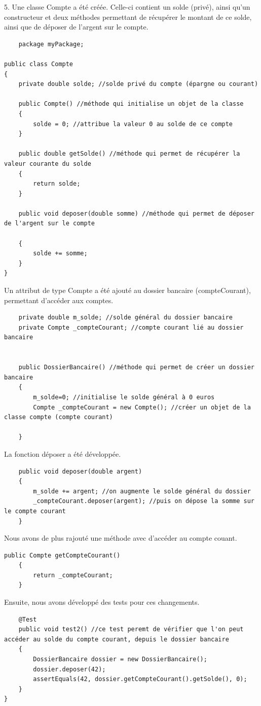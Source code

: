 \documentclass{article}
\begin{document}
5.
Une classe Compte a été créée. Celle-ci contient un solde (privé), ainsi qu'un constructeur et deux méthodes permettant de récupérer
le montant de ce solde, ainsi que de déposer de l'argent sur le compte.
\begin{lstlisting}
    package myPackage;

public class Compte
{
	private double solde; //solde privé du compte (épargne ou courant)
	
	public Compte() //méthode qui initialise un objet de la classe
	{
		solde = 0; //attribue la valeur 0 au solde de ce compte
	}
	
	public double getSolde() //méthode qui permet de récupérer la valeur courante du solde
	{
		return solde;
	}
	
	public void deposer(double somme) //méthode qui permet de déposer de l'argent sur le compte
   
	{
		solde += somme;
	}
}
\end{lstlisting}
Un attribut de type Compte a été ajouté au dossier bancaire (compteCourant), permettant d'accéder aux comptes.
\begin{lstlisting}
    private double m_solde; //solde général du dossier bancaire
    private Compte _compteCourant; //compte courant lié au dossier bancaire
	
	
    public DossierBancaire() //méthode qui permet de créer un dossier bancaire
    {
    	m_solde=0; //initialise le solde général à 0 euros
    	Compte _compteCourant = new Compte(); //créer un objet de la classe compte (compte courant)
    	
    }
\end{lstlisting}
La fonction déposer a été développée.
\begin{lstlisting}
    public void deposer(double argent)
    {
    	m_solde += argent; //on augmente le solde général du dossier
    	_compteCourant.deposer(argent); //puis on dépose la somme sur le compte courant
    }
\end{lstlisting}
Nous avons de plus rajouté une méthode avec d'accéder au compte couant.

\begin{lstlisting}
public Compte getCompteCourant()
    {
    	return _compteCourant;
    }
\end{lstlisting}


Ensuite, nous avons développé des tests pour ces changements.
\begin{lstlisting}
	@Test  
	public void test2() //ce test peremt de vérifier que l'on peut accéder au solde du compte courant, depuis le dossier bancaire
	{
		DossierBancaire dossier = new DossierBancaire();
		dossier.deposer(42);
		assertEquals(42, dossier.getCompteCourant().getSolde(), 0);		
	}
}
\end{lstlisting}
\end{document}
